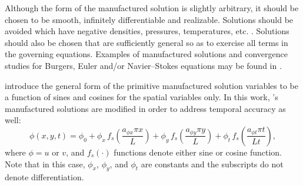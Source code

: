 \documentclass[10pt]{article}
\begin{document}
Although the form of the manufactured solution is slightly arbitrary, it should be chosen to be smooth, infinitely differentiable and realizable. Solutions should be avoided which have negative densities, pressures, temperatures, etc. \cite{KnuppSalari2003,Roy2004}. Solutions should also be chosen that are sufficiently general so as to exercise all terms in the governing equations. Examples of manufactured solutions and convergence studies for Burgers, Euler and/or Navier--Stokes equations may be found in \cite{Roy2002,KnuppSalari2003,Roy2004,Bond2007,Orozco2010}.

\cite{Roy2002} introduce the general form of the primitive manufactured solution variables to be  a function of sines and cosines for the spatial variables only. In this work, \cite{Roy2002}'s manufactured solutions are modified in order to address temporal accuracy as well:
\begin{equation*}
 \label{eq:manufactured01}
  \phi (x,y,t) = \phi_0+ \phi_x\, f_s \left(\frac{a_{\phi x} \pi x}{L} \right) +  \phi_y \,f_s\left(\frac{a_{\phi y} \pi y}{L}\right) +  \phi_t \,f_s\left(\frac{a_{\phi t} \pi t}{Lt}\right),
\end{equation*}
where $\phi=u$ or $v$, and $f_s(\cdot)$ functions denote either sine or cosine function. Note that in this case, $\phi_x$, $\phi_y$,  and $\phi_t$ are constants  and the subscripts do not denote differentiation.
% 
\end{document}
